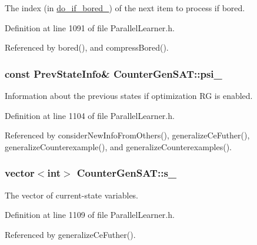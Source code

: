The index (in \hyperlink{classCounterGenSAT_ae4f7bf80b40a44580fde913f300ac4c1}{do\-\_\-if\-\_\-bored\-\_\-}) of the next item to process if bored. 



Definition at line 1091 of file Parallel\-Learner.\-h.



Referenced by bored(), and compress\-Bored().

\hypertarget{classCounterGenSAT_a68c5a01f380979af79bf45061a9a1e37}{
\subsubsection[{psi\-\_\-}]{\setlength{\rightskip}{0pt plus 5cm}const {\bf Prev\-State\-Info}\& Counter\-Gen\-S\-A\-T\-::psi\-\_\-\hspace{0.3cm}{\ttfamily [protected]}}}\label{classCounterGenSAT_a68c5a01f380979af79bf45061a9a1e37}


Information about the previous states if optimization R\-G is enabled. 



Definition at line 1104 of file Parallel\-Learner.\-h.



Referenced by consider\-New\-Info\-From\-Others(), generalize\-Ce\-Futher(), generalize\-Counterexample(), and generalize\-Counterexamples().

\hypertarget{classCounterGenSAT_a5fe0494a5158f8614cdf358f1776dc25}{
\subsubsection[{s\-\_\-}]{\setlength{\rightskip}{0pt plus 5cm}vector$<$int$>$ Counter\-Gen\-S\-A\-T\-::s\-\_\-\hspace{0.3cm}{\ttfamily [protected]}}}\label{classCounterGenSAT_a5fe0494a5158f8614cdf358f1776dc25}


The vector of current-\/state variables. 



Definition at line 1109 of file Parallel\-Learner.\-h.



Referenced by generalize\-Ce\-Futher().

